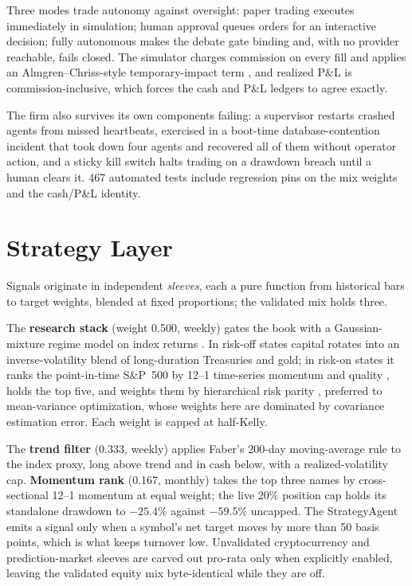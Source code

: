 \documentclass[conference]{IEEEtran}
\begin{document}
Three modes trade autonomy against oversight: paper trading executes
immediately in simulation; human approval queues orders for an interactive
decision; fully autonomous makes the debate gate binding and, with no provider
reachable, fails closed. The simulator charges commission on every fill and
applies an Almgren--Chriss-style temporary-impact term
\cite{almgren2001optimal}, and realized P\&L is commission-inclusive, which
forces the cash and P\&L ledgers to agree exactly.

The firm also survives its own components failing: a supervisor restarts
crashed agents from missed heartbeats, exercised in a boot-time
database-contention incident that took down four agents and recovered all of
them without operator action, and a sticky kill switch halts trading on a
drawdown breach until a human clears it. 467 automated tests include regression
pins on the mix weights and the cash/P\&L identity.

\section{Strategy Layer}
\label{sec:sleeves}

Signals originate in independent \emph{sleeves}, each a pure function from
historical bars to target weights, blended at fixed proportions; the validated
mix holds three.

The \textbf{research stack} (weight 0.500, weekly) gates the book with a
Gaussian-mixture regime model on index returns \cite{kritzman2012regime}. In
risk-off states capital rotates into an inverse-volatility blend of
long-duration Treasuries and gold; in risk-on states it ranks the point-in-time
S\&P~500 by 12--1 time-series momentum \cite{jegadeesh1993returns} and quality
\cite{asness2019qmj}, holds the top five, and weights them by hierarchical risk
parity \cite{lopezdeprado2016hrp}, preferred to mean-variance optimization,
whose weights here are dominated by covariance estimation error. Each weight is
capped at half-Kelly.

The \textbf{trend filter} (0.333, weekly) applies Faber's 200-day
moving-average rule \cite{faber2007tactical} to the index proxy, long above
trend and in cash below, with a realized-volatility cap. \textbf{Momentum
rank} (0.167, monthly) takes the top three names by cross-sectional 12--1
momentum at equal weight; the live 20\% position cap holds its standalone
drawdown to $-25.4\%$ against $-59.5\%$ uncapped. The StrategyAgent emits a
signal only when a symbol's net target moves by more than 50 basis points,
which is what keeps turnover low. Unvalidated cryptocurrency and
prediction-market sleeves are carved out pro-rata only when explicitly enabled,
leaving the validated equity mix byte-identical while they are off.
\end{document}
